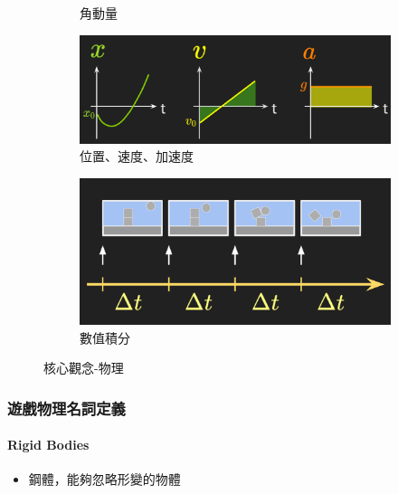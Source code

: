 \begin{figure}[h]
\begin{subfigure}[b]{0.3\linewidth}
    \caption{角動量}
    \end{subfigure}
    \begin{subfigure}[b]{0.5\linewidth}
    \includegraphics[width=\linewidth]{./resources/physics/xva.png}
    \caption{位置、速度、加速度}
    \end{subfigure}
    \begin{subfigure}[b]{0.5\linewidth}
    \includegraphics[width=\linewidth]{./resources/physics/deltaT.png}
    \caption{數值積分}
    \end{subfigure}
\caption{核心觀念-物理}
\label{fig:idea_physics}
\end{figure}


\subsubsection{遊戲物理名詞定義}

\paragraph{Rigid Bodies}
\begin{itemize}
    \item{鋼體，能夠忽略形變的物體}
\end{itemize}

